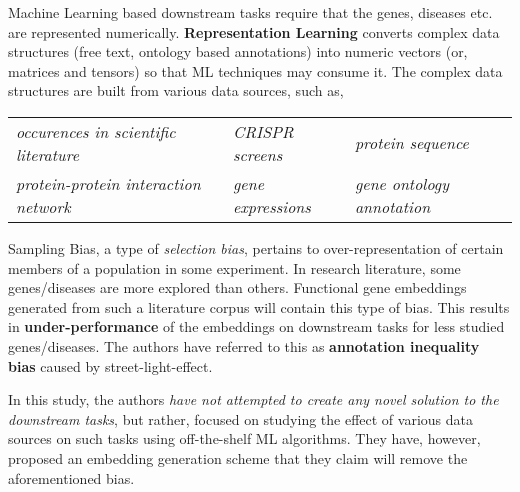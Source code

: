 \begin{sloppypar*}

    Machine Learning based downstream tasks require that the genes, diseases etc.
    are represented numerically. \textbf{Representation Learning} converts complex
    data structures (free text, ontology based annotations) into numeric vectors
    (or, matrices and tensors) so that ML techniques may consume it. The complex
    data structures are built from various data sources, such as, \hfill\break

    \begin{tabularx}{\textwidth}{XXX}
        \textit{occurences in scientific literature} & \textit{CRISPR screens} & \textit{protein sequence} \\
        \textit{protein-protein interaction network} & \textit{gene expressions} & \textit{gene ontology annotation} \\
    \end{tabularx} \hfill\break
    \noindent Sampling Bias, a type of \textit{selection bias}, pertains to
    over-representation of certain members of a population in some experiment. 
    In research literature, some genes/diseases are more explored than others.
    Functional gene embeddings generated from such a literature corpus will contain
    this type of bias. This results in \textbf{under-performance} of the embeddings
    on downstream tasks for less studied genes/diseases. The authors have referred
    to this as \textbf{annotation inequality bias} caused by street-light-effect. \hfill\break

    \noindent In this study, the authors \textit{have not attempted to create any novel
    solution to the downstream tasks}, but rather, focused on studying the effect
    of various data sources on such tasks using off-the-shelf ML algorithms. They
    have, however, proposed an embedding generation scheme that they claim will
    remove the aforementioned bias.

\end{sloppypar*}
